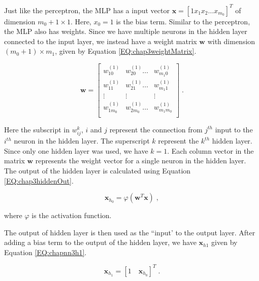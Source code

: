         Just like the perceptron, the MLP has a input vector $\mathbf{x} = [1 x_1 x_2 \ldots x_{m_{0}}]^T$ of dimension $m_0 + 1 \times 1$. Here, $x_0 = 1$ is the bias term. Similar to the perceptron, the MLP also has weights. Since we have multiple neurons in the hidden layer connected to the input layer, we instead have a weight matrix $\mathbf{w}$ with dimension $(m_0 + 1) \times m_1$, given by Equation \ref{EQ:chap3weightMatrix}.
        
        
        \begin{equation}
        	\mathbf{w} = \begin{bmatrix}
        		w_{10}^{(1)} 	&w_{20}^{(1)} \ldots 	& w_{m_{1}0}^{(1)} \\
        		w_{11}^{(1)} 	&w_{21}^{(1)} \ldots 	& w_{m_{1}1}^{(1)} \\
            	\vdots     	&\vdots    			& \vdots \\
        		w_{1m_{0}}^{(1)} &w_{2m_{0}}^{(1)} \ldots &w_{m_{1}m_{0}}^{(1)} \\
        	\end{bmatrix} \;.
        	\label{EQ:chap3weightMatrix}
        \end{equation}
       
       Here the subscript in $w_{ij}^k$, $i$ and $j$ represent the connection from $j^{th}$ input to the $i^{th}$ neuron in the hidden layer. The superscript $k$ represent the $k^{th}$ hidden layer. Since only one hidden layer was used, we have $k = 1$. Each column vector in the matrix $\mathbf{w}$ represents the weight vector for a single neuron in the hidden layer. The output of the hidden layer is calculated using Equation \ref{EQ:chap3hiddenOut}.
       
       
       	\begin{equation}
       		\mathbf{x}_{h_0} = \varphi(\mathbf{w}^T \mathbf{x}) \;,
       		\label{EQ:chap3hiddenOut}
       	\end{equation}
        
        \noindent where $\varphi$ is the activation function.
        
        The output of hidden layer is then used as the ``input' to the output layer. After adding a bias term to the output of the hidden layer, we have $\mathbf{x}_{h{1}}$ given by Equation \ref{EQ:chapnn3h1}.
        
        
        \begin{equation}
        	\mathbf{x}_{h_1} = [1\quad \mathbf{x}_{h_0}]^T \;.
        	\label{EQ:chapnn3h1}
        \end{equation}
        
